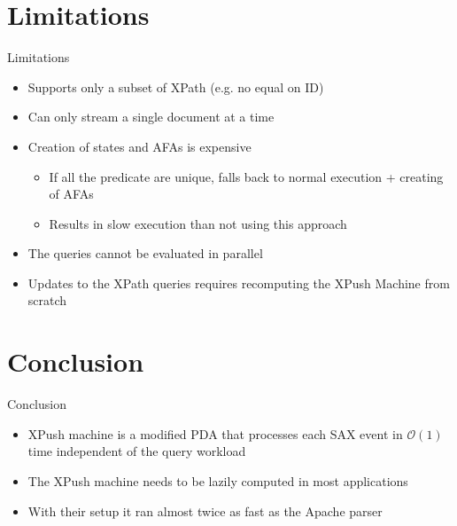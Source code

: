 \documentclass[mathserif,serif]{beamer}
\begin{document}
\section{Limitations}
\begin{frame}{Limitations}
  \begin{itemize}
    \item Supports only a subset of XPath (e.g. no equal on ID)
    \item Can only stream a single document at a time
    \item Creation of states and AFAs is expensive
    \begin{itemize}
      \item If all the predicate are unique, falls back to normal execution + creating of AFAs
      \item Results in slow execution than not using this approach
    \end{itemize}
    \item The queries cannot be evaluated in parallel
    \item Updates to the XPath queries requires recomputing the XPush Machine from scratch
  \end{itemize}
\end{frame}

\section{Conclusion}
\begin{frame}{Conclusion}
  \begin{itemize}
    \item XPush machine is a modified PDA that processes each SAX event in $\mathcal{O}(1)$ time independent of the query workload
    \item The XPush machine needs to be lazily computed in most applications
    \item With their setup it ran almost twice as fast as the Apache parser
  \end{itemize}
\end{frame}
\end{document}
